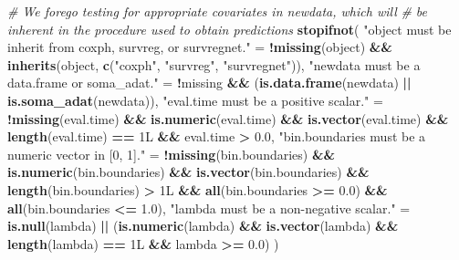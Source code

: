 \documentclass[
]{book}
\newenvironment{Shaded}{\begin{snugshade}}{\end{snugshade}}
\newcommand{\CommentTok}[1]{\textcolor[rgb]{0.56,0.35,0.01}{\textit{#1}}}
\newcommand{\FloatTok}[1]{\textcolor[rgb]{0.00,0.00,0.81}{#1}}
\newcommand{\FunctionTok}[1]{\textcolor[rgb]{0.13,0.29,0.53}{\textbf{#1}}}
\newcommand{\NormalTok}[1]{#1}
\newcommand{\OtherTok}[1]{\textcolor[rgb]{0.56,0.35,0.01}{#1}}
\newcommand{\SpecialCharTok}[1]{\textcolor[rgb]{0.81,0.36,0.00}{\textbf{#1}}}
\newcommand{\StringTok}[1]{\textcolor[rgb]{0.31,0.60,0.02}{#1}}
\begin{document}
\begin{Shaded}
\begin{Highlighting}[]
  \CommentTok{\# We forego testing for appropriate covariates in \textasciigrave{}newdata\textasciigrave{}, which will}
  \CommentTok{\#   be inherent in the procedure used to obtain predictions}
  \FunctionTok{stopifnot}\NormalTok{(}
    \StringTok{"\textasciigrave{}object\textasciigrave{} must be inherit from \textasciigrave{}coxph\textasciigrave{}, \textasciigrave{}survreg\textasciigrave{}, or \textasciigrave{}survregnet\textasciigrave{}."} \OtherTok{=}
      \SpecialCharTok{!}\FunctionTok{missing}\NormalTok{(object) }\SpecialCharTok{\&\&} \FunctionTok{inherits}\NormalTok{(object, }\FunctionTok{c}\NormalTok{(}\StringTok{"coxph"}\NormalTok{, }\StringTok{"survreg"}\NormalTok{, }\StringTok{"survregnet"}\NormalTok{)),}
    \StringTok{"\textasciigrave{}newdata\textasciigrave{} must be a data.frame or soma\_adat."} \OtherTok{=} 
      \SpecialCharTok{!}\NormalTok{missing }\SpecialCharTok{\&\&}\NormalTok{ (}\FunctionTok{is.data.frame}\NormalTok{(newdata) }\SpecialCharTok{||} \FunctionTok{is.soma\_adat}\NormalTok{(newdata)),}
    \StringTok{"\textasciigrave{}eval.time\textasciigrave{} must be a positive scalar."} \OtherTok{=} 
      \SpecialCharTok{!}\FunctionTok{missing}\NormalTok{(eval.time) }\SpecialCharTok{\&\&} \FunctionTok{is.numeric}\NormalTok{(eval.time) }\SpecialCharTok{\&\&} 
        \FunctionTok{is.vector}\NormalTok{(eval.time) }\SpecialCharTok{\&\&} \FunctionTok{length}\NormalTok{(eval.time) }\SpecialCharTok{==}\NormalTok{ 1L }\SpecialCharTok{\&\&}\NormalTok{ eval.time }\SpecialCharTok{\textgreater{}} \FloatTok{0.0}\NormalTok{,}
    \StringTok{"\textasciigrave{}bin.boundaries\textasciigrave{} must be a numeric vector in [0, 1]."} \OtherTok{=} 
      \SpecialCharTok{!}\FunctionTok{missing}\NormalTok{(bin.boundaries) }\SpecialCharTok{\&\&} \FunctionTok{is.numeric}\NormalTok{(bin.boundaries) }\SpecialCharTok{\&\&} 
        \FunctionTok{is.vector}\NormalTok{(bin.boundaries) }\SpecialCharTok{\&\&} \FunctionTok{length}\NormalTok{(bin.boundaries) }\SpecialCharTok{\textgreater{}}\NormalTok{ 1L }\SpecialCharTok{\&\&} 
        \FunctionTok{all}\NormalTok{(bin.boundaries }\SpecialCharTok{\textgreater{}=} \FloatTok{0.0}\NormalTok{) }\SpecialCharTok{\&\&} \FunctionTok{all}\NormalTok{(bin.boundaries }\SpecialCharTok{\textless{}=} \FloatTok{1.0}\NormalTok{),}
    \StringTok{"\textasciigrave{}lambda\textasciigrave{} must be a non{-}negative scalar."} \OtherTok{=} 
      \FunctionTok{is.null}\NormalTok{(lambda) }\SpecialCharTok{||}\NormalTok{ (}\FunctionTok{is.numeric}\NormalTok{(lambda) }\SpecialCharTok{\&\&} \FunctionTok{is.vector}\NormalTok{(lambda) }\SpecialCharTok{\&\&} 
                            \FunctionTok{length}\NormalTok{(lambda) }\SpecialCharTok{==}\NormalTok{ 1L }\SpecialCharTok{\&\&}\NormalTok{ lambda }\SpecialCharTok{\textgreater{}=} \FloatTok{0.0}\NormalTok{)}
\NormalTok{  )}
  

\end{Highlighting}
\end{Shaded}
\end{document}

